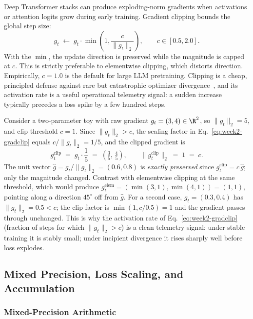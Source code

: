 Deep Transformer stacks can produce exploding-norm gradients when
activations or attention logits grow during early training. Gradient
clipping bounds the global step size:
\begin{equation}
\label{eq:week2-gradclip}
g_t \;\leftarrow\; g_t \cdot \min\!\left(1, \frac{c}{\|g_t\|_2}\right),
\qquad c \in [0.5, 2.0].
\end{equation}
With the $\min$, the update direction is preserved while the magnitude
is capped at $c$. This is strictly preferable to elementwise clipping,
which distorts direction. Empirically, $c = 1.0$ is the default for
large LLM pretraining. Clipping is a cheap, principled defense against
rare but catastrophic optimizer divergence~\citep{pascanu2013difficulty},
and its activation rate is a useful operational telemetry signal: a
sudden increase typically precedes a loss spike by a few hundred steps.

\begin{workedexample}
Consider a two-parameter toy with raw gradient
$g_t = (3, 4) \in \R^{2}$, so $\|g_t\|_2 = 5$, and clip threshold
$c = 1$. Since $\|g_t\|_2 > c$, the scaling factor in
Eq.~\eqref{eq:week2-gradclip} equals $c / \|g_t\|_2 = 1/5$, and the
clipped gradient is
\[
g_t^{\mathrm{clip}}
  \;=\; g_t \cdot \frac{1}{5}
  \;=\; \left(\tfrac{3}{5},\,\tfrac{4}{5}\right),
\qquad
\|g_t^{\mathrm{clip}}\|_2 \;=\; 1 \;=\; c.
\]
The unit vector $\hat g = g_t / \|g_t\|_2 = (0.6, 0.8)$ is \emph{exactly
preserved} since $g_t^{\mathrm{clip}} = c\,\hat g$; only the magnitude
changed. Contrast with elementwise clipping at the same threshold,
which would produce $g_t^{\mathrm{elem}} = (\min(3,1), \min(4,1)) = (1,1)$,
pointing along a direction $45^{\circ}$ off from $\hat g$. For a
second case, $g_t = (0.3, 0.4)$ has $\|g_t\|_2 = 0.5 < c$; the clip
factor is $\min(1, c/0.5) = 1$ and the gradient passes through
unchanged. This is why the activation rate of Eq.~\eqref{eq:week2-gradclip}
(fraction of steps for which $\|g_t\|_2 > c$) is a clean telemetry
signal: under stable training it is stably small; under incipient
divergence it rises sharply well before loss explodes.
\end{workedexample}

\subsection{Mixed Precision, Loss Scaling, and Accumulation}

\subsubsection{Mixed-Precision Arithmetic}

